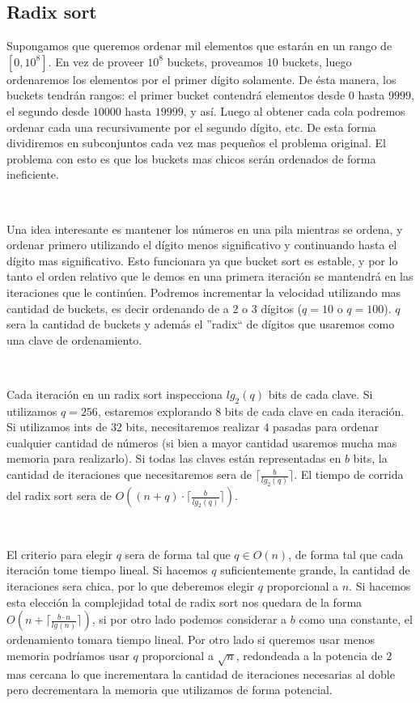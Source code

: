 \subsection{Radix sort}

Supongamos que queremos ordenar mil elementos que estar\'an en un rango de $[0, 10^8]$. En vez de proveer $10^8$ buckets, proveamos $10$ buckets, luego ordenaremos los elementos por el primer d\'igito solamente. De \'esta manera, los buckets tendr\'an rangos: el primer bucket  contendr\'a elementos desde $0$ hasta $9999$, el segundo desde $10000$ hasta $19999$, y as\'i. Luego al obtener cada cola podremos ordenar cada una recursivamente por el segundo d\'igito, etc. De esta forma dividiremos en subconjuntos cada vez mas peque\~nos el problema original. El problema con esto es que los buckets mas chicos ser\'an ordenados de forma ineficiente.

~

Una idea interesante es mantener los n\'umeros en una pila mientras se ordena, y ordenar primero utilizando el d\'igito menos significativo y continuando hasta el d\'igito mas significativo. Esto funcionara ya que bucket sort es estable, y por lo tanto el orden relativo que le demos en una primera iteraci\'on se mantendr\'a en las iteraciones que le contin\'uen. Podremos incrementar la velocidad utilizando mas cantidad de buckets, es decir ordenando de a 2 o 3 d\'igitos ($q=10$ o $q=100$). $q$ sera la cantidad de buckets y adem\'as el ''radix`` de d\'igitos que usaremos como una clave de ordenamiento.

~

Cada iteraci\'on en un radix sort inspecciona $lg_2(q)$ bits de cada clave. Si utilizamos $q=256$, estaremos explorando $8$ bits de cada clave en cada iteraci\'on. Si utilizamos ints de $32$ bits, necesitaremos realizar $4$ pasadas para ordenar cualquier cantidad de n\'umeros (si bien a mayor cantidad usaremos mucha mas memoria para realizarlo). Si todas las claves est\'an representadas en $b$ bits, la cantidad de iteraciones que necesitaremos sera de $\lceil \frac{b}{lg_2(q)} \rceil$. El tiempo de corrida del radix sort sera de $O((n+q) \cdot \lceil \frac{b}{lg_2(q)} \rceil)$.

~

El criterio para elegir $q$ sera de forma tal que $q \in O(n)$, de forma tal que cada iteraci\'on tome tiempo lineal. Si hacemos $q$ suficientemente grande, la cantidad de iteraciones sera chica, por lo que deberemos elegir $q$ proporcional a $n$. Si hacemos esta elecci\'on la complejidad total de radix sort nos quedara de la forma $O(n + \lceil \frac{b \cdot n}{lg(n)} \rceil)$, si por otro lado podemos considerar a $b$ como una constante, el ordenamiento tomara tiempo lineal. Por otro lado si queremos usar menos memoria podr\'iamos usar $q$ proporcional a $\sqrt{n}$, redondeada a la potencia de $2$ mas cercana lo que incrementara la cantidad de iteraciones necesarias al doble pero decrementara la memoria que utilizamos de forma potencial.


